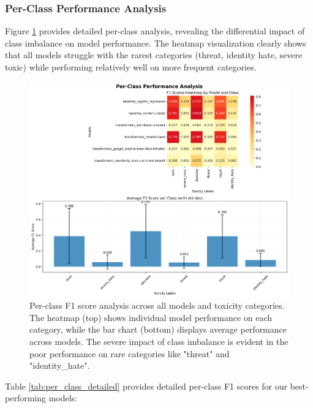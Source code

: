 \documentclass[11pt]{article}
\begin{document}
\subsubsection{Per-Class Performance Analysis}

Figure \ref{fig:per_class} provides detailed per-class analysis, revealing the differential impact of class imbalance on model performance. The heatmap visualization clearly shows that all models struggle with the rarest categories (threat, identity hate, severe toxic) while performing relatively well on more frequent categories.

\begin{figure}[ht]
    \centering
    \includegraphics[width=\textwidth]{per_class_analysis.png}
    \caption{Per-class F1 score analysis across all models and toxicity categories. The heatmap (top) shows individual model performance on each category, while the bar chart (bottom) displays average performance across models. The severe impact of class imbalance is evident in the poor performance on rare categories like "threat" and "identity\_hate".}
    \label{fig:per_class}
\end{figure}

Table \ref{tab:per_class_detailed} provides detailed per-class F1 scores for our best-performing models:
\end{document}
